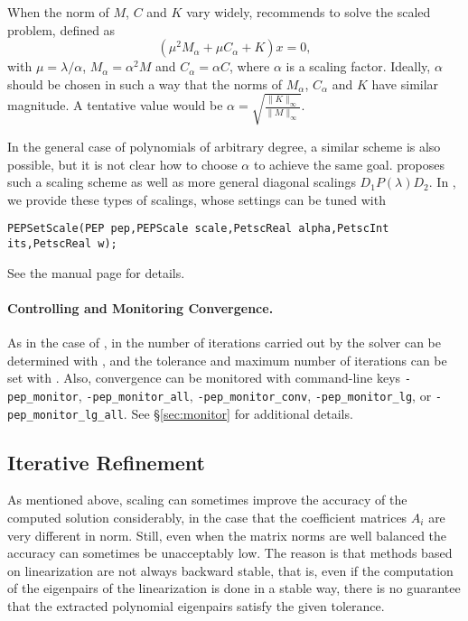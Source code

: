 When the norm of $M$, $C$ and $K$ vary widely, \cite{Tisseur:2000:BEC} recommends to solve the scaled problem, defined as 
\begin{equation}
(\mu^2M_\alpha+\mu C_\alpha+K)x=0,\label{eq:scaled}
\end{equation}
with $\mu=\lambda/\alpha$, $M_\alpha=\alpha^2M$ and $C_\alpha=\alpha C$, where $\alpha$ is a scaling factor. Ideally, $\alpha$ should be chosen in such a way that the norms of $M_\alpha$, $C_\alpha$ and $K$ have similar magnitude. A tentative value would be $\alpha=\sqrt{\frac{\|K\|_\infty}{\|M\|_\infty}}$.

In the general case of polynomials of arbitrary degree, a similar scheme is also possible, but it is not clear how to choose $\alpha$ to achieve the same goal. \cite{Betcke:2008:OSG} proposes such a scaling scheme as well as more general diagonal scalings $D_1P(\lambda)D_2$. In \slepc, we provide these types of scalings, whose settings can be tuned with
	\begin{Verbatim}[fontsize=\small]
	PEPSetScale(PEP pep,PEPScale scale,PetscReal alpha,PetscInt its,PetscReal w);
	\end{Verbatim}
See the manual page for details.

\paragraph{Controlling and Monitoring Convergence.}

As in the case of , in  the number of iterations carried out by the solver can be determined with , and the tolerance and maximum number of iterations can be set with . Also, convergence can be monitored with command-line keys \Verb!-pep_monitor!, \Verb!-pep_monitor_all!, \Verb!-pep_monitor_conv!, \Verb!-pep_monitor_lg!, or \Verb!-pep_monitor_lg_all!. See \S\ref{sec:monitor} for additional details.

\subsection{\label{sec:refine}Iterative Refinement}

As mentioned above, scaling can sometimes improve the accuracy of the computed solution considerably, in the case that the coefficient matrices $A_i$ are very different in norm. Still, even when the matrix norms are well balanced the accuracy can sometimes be unacceptably low. The reason is that methods based on linearization are not always backward stable, that is, even if the computation of the eigenpairs of the linearization is done in a stable way, there is no guarantee that the extracted polynomial eigenpairs satisfy the given tolerance.

